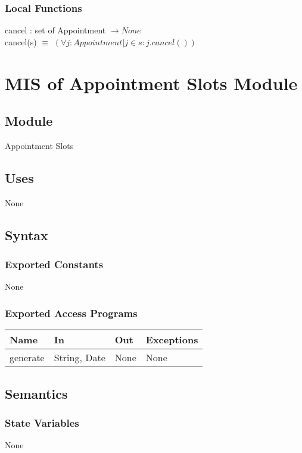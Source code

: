 \documentclass[12pt, titlepage]{article}
\begin{document}
\subsubsection{Local Functions}
cancel : set of Appointment $\rightarrow None$ \\
cancel(s) $\equiv$ $(\forall j:Appointment| j \in s : j.cancel())$

\newpage

\section{MIS of Appointment Slots Module} \label{mAppointmentSlots} 

\subsection{Module}
Appointment Slots

\subsection{Uses}
None

\subsection{Syntax}

\subsubsection{Exported Constants}
None

\subsubsection{Exported Access Programs}
\begin{center}
\begin{tabular}{p{2cm} p{4cm} p{4cm} p{2cm}}
\hline
\textbf{Name} & \textbf{In} & \textbf{Out} & \textbf{Exceptions} \\
\hline
generate & String, Date & None & None \\
\hline
\end{tabular}
\end{center}

\subsection{Semantics}

\subsubsection{State Variables}
None
\end{document}
